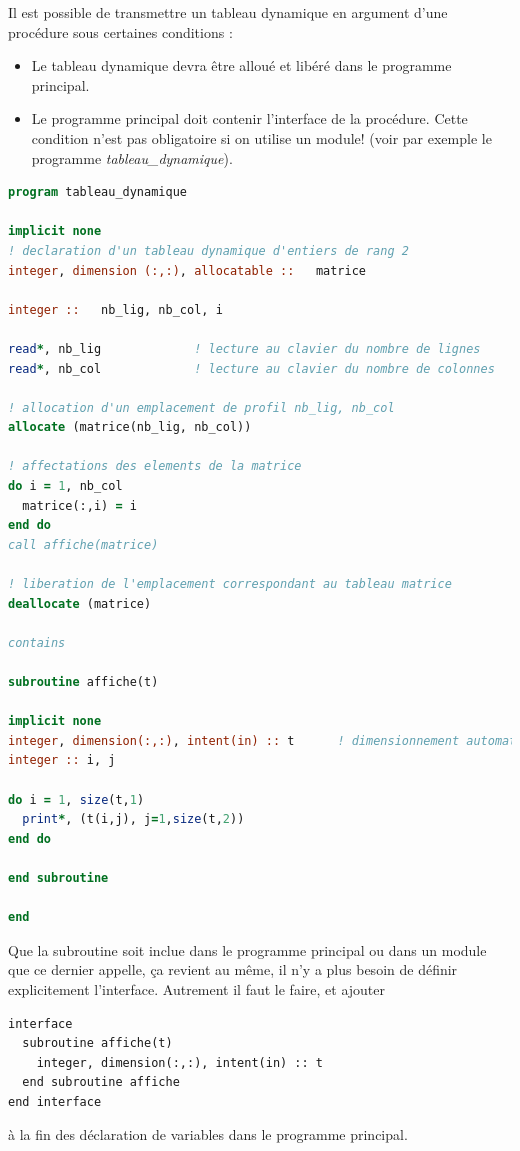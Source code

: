 \documentclass[a4paper,twoside]{article}
\begin{document}
\bigskip

Il est possible de transmettre un tableau dynamique en argument d'une procédure sous certaines conditions : 
\begin{itemize}
\item Le tableau dynamique devra être alloué et libéré dans le programme principal. 
\item Le programme principal doit contenir l'interface de la procédure. Cette condition n'est pas obligatoire si on utilise un module! (voir par exemple le programme \emph{tableau\_dynamique}).
\end{itemize}

\begin{lstlisting}[language=Fortran]
program tableau_dynamique
 
implicit none 
! declaration d'un tableau dynamique d'entiers de rang 2 
integer, dimension (:,:), allocatable ::   matrice

integer ::   nb_lig, nb_col, i

read*, nb_lig             ! lecture au clavier du nombre de lignes
read*, nb_col             ! lecture au clavier du nombre de colonnes

! allocation d'un emplacement de profil nb_lig, nb_col
allocate (matrice(nb_lig, nb_col))    

! affectations des elements de la matrice 
do i = 1, nb_col
  matrice(:,i) = i
end do
call affiche(matrice)

! liberation de l'emplacement correspondant au tableau matrice 
deallocate (matrice) 

contains

subroutine affiche(t)
 
implicit none 
integer, dimension(:,:), intent(in) :: t      ! dimensionnement automatique
integer :: i, j 

do i = 1, size(t,1) 
  print*, (t(i,j), j=1,size(t,2))
end do

end subroutine

end 

\end{lstlisting}
Que la subroutine soit inclue dans le programme principal ou dans un module que ce dernier appelle, ça revient au même, il n'y a plus besoin de définir explicitement l'interface. Autrement il faut le faire, et ajouter
\begin{verbatim}
interface 
  subroutine affiche(t) 
    integer, dimension(:,:), intent(in) :: t 
  end subroutine affiche 
end interface 
\end{verbatim}
à la fin des déclaration de variables dans le programme principal.
\end{document}
